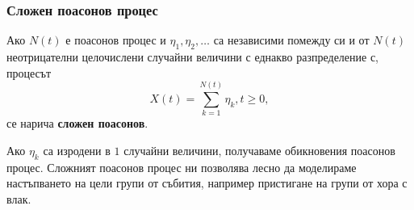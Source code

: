 \documentclass{../../common/topic}
\begin{document}
\subsubsection{Сложен поасонов процес}

\begin{definition}
  Ако \( N(t) \) е поасонов процес и \( \eta_1, \eta_2, \ldots \) са независими помежду си и от \( N(t) \) неотрицателни целочислени случайни величини с еднакво разпределение с, процесът
  \begin{equation*}
    X(t) = \sum_{k=1}^{N(t)} \eta_k, t \geq 0,
  \end{equation*}
  се нарича \textbf{сложен поасонов}.
\end{definition}

\begin{remark}
  Ако \( \eta_k \) са изродени в \( 1 \) случайни величини, получаваме обикновения поасонов процес. Сложният поасонов процес ни позволява лесно да моделираме настъпването на цели групи от събития, например пристигане на групи от хора с влак.
\end{remark}
\end{document}
